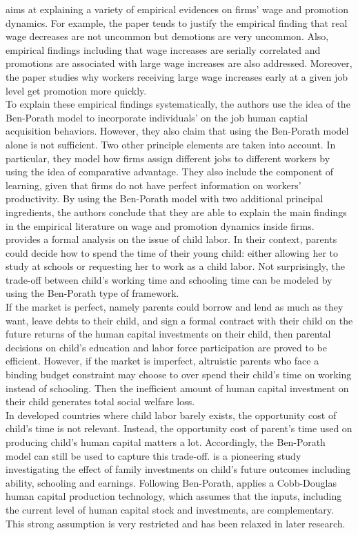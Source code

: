 \indent \citet{gibbons1999theory} aims at explaining a variety of empirical evidences on firms' wage and promotion dynamics. For example, the paper tends to justify the empirical finding that real wage decreases are not uncommon but demotions are very uncommon. Also, empirical findings including that wage increases are serially correlated and promotions are associated with large wage increases are also addressed. Moreover, the paper studies why workers receiving large wage increases early at a given job level get promotion more quickly.\\
\indent To explain these empirical findings systematically, the authors use the idea of the Ben-Porath model to incorporate individuals' on the job human captial acquisition behaviors. However, they also claim that using the Ben-Porath model alone is not sufficient. Two other principle elements are taken into account. In particular, they model how firms assign different jobs to different workers by using the idea of comparative advantage. They also include the component of learning, given that firms do not have perfect information on workers' productivity. By using the Ben-Porath model with two additional principal ingredients, the authors conclude that they are able to explain the main findings in the empirical literature on wage and promotion dynamics inside firms.\\
\indent \citet{baland2000child} provides a formal analysis on the issue of child labor. In their context, parents could decide how to spend the time of their young child: either allowing her to study at schools or requesting her to work as a child labor. Not surprisingly, the trade-off between child's working time and schooling time can be modeled by using the Ben-Porath type of framework.\\
\indent If the market is perfect, namely parents could borrow and lend as much as they want, leave debts to their child, and sign a formal contract with their child on the future returns of the human capital investments on their child, then parental decisions on child's education and labor force participation are proved to be efficient. However, if the market is imperfect, altruistic parents who face a binding budget constraint may choose to over spend their child's time on working instead of schooling. Then the inefficient amount of human capital investment on their child generates total social welfare loss.\\
\indent In developed countries where child labor barely exists, the opportunity cost of child's time is not relevant. Instead, the opportunity cost of parent's time used on producing child's human capital matters a lot. Accordingly, the Ben-Porath model can still be used to capture this trade-off. \citet{leibowitz1974home} is a pioneering study investigating the effect of family investments on child's future outcomes including ability, schooling and earnings. Following Ben-Porath, \citet{leibowitz1974home} applies a Cobb-Douglas human capital production technology, which assumes that the inputs, including the current level of human capital stock and investments, are complementary. This strong assumption is very restricted and has been relaxed in later research. \\
